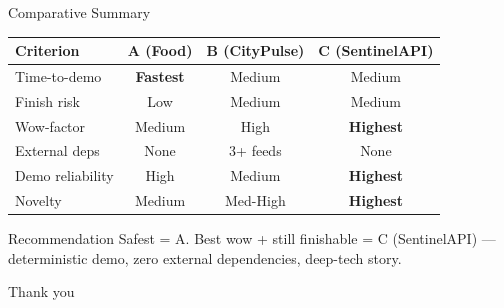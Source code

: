\documentclass[10pt,aspectratio=169]{beamer}
\begin{document}
\begin{frame}{Comparative Summary}
  \centering
  \begin{tabular}{lccc}
    \toprule
    Criterion & A (Food) & B (CityPulse) & C (SentinelAPI) \\
    \midrule
    Time-to-demo & \textbf{Fastest} & Medium & Medium \\
    Finish risk & Low & Medium & Medium \\
    Wow-factor & Medium & High & \textbf{Highest} \\
    External deps & None & 3+ feeds & None \\
    Demo reliability & High & Medium & \textbf{Highest} \\
    Novelty & Medium & Med-High & \textbf{Highest} \\
    \bottomrule
  \end{tabular}

  \vspace{4mm}
  \begin{block}{Recommendation}
    Safest = A. Best wow + still finishable = \alert{C (SentinelAPI)} —
    deterministic demo, zero external dependencies, deep-tech story.
  \end{block}
\end{frame}

\begin{frame}
  \centering
  {\LARGE Thank you}
\end{frame}
\end{document}
